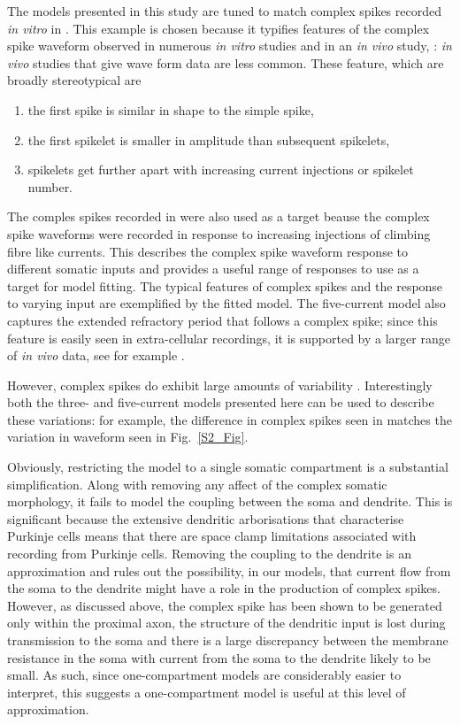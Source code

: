 \documentclass[twocolumn]{svjour3}          %
\begin{document}
The models presented in this study are tuned to match complex spikes
recorded \textsl{in vitro} in \citet{DavieEtAl2008}. This example is
chosen because it typifies features of the complex spike
waveform observed in numerous \textsl{in vitro} studies
\citep{ZaghaEtAl2008,zhang2017ethanol,MonsivaisEtAl2005,khaliq2005axonal} and in an \textsl{in vivo} study, \citet{WarnaarEtAl2015}:
\textsl{in vivo} studies that give wave form data are less common. These feature, which are broadly
stereotypical are
\begin{enumerate}
\item the first spike is similar in shape to the simple spike,
\item the first spikelet is smaller in amplitude than subsequent spikelets,
\item spikelets get further apart with increasing current injections or spikelet number.
\end{enumerate}
The comples spikes recorded in \citet{DavieEtAl2008} were also used as
a target beause the complex spike waveforms were recorded in response
to increasing injections of climbing fibre like currents. This
describes the complex spike waveform response to different somatic
inputs and provides a useful range of responses to use as a target for
model fitting. The typical features of complex spikes and the response
to varying input are exemplified by the fitted model. The five-current
model also captures the extended refractory period that follows a
complex spike; since this feature is easily seen in extra-cellular
recordings, it is supported by a larger range of \textsl{in vivo}
data, see for example
\citet{GranitPhillips1956,LathamPaul1970,BloedelRoberts1971,ArmstrongRawson1979,BausweinEtAl1983,SatoEtAl1992,BurroughsEtAl2016}.

However, complex spikes do exhibit large amounts of variability
\citep{BurroughsEtAl2016,WarnaarEtAl2015}. Interestingly both the
three- and five-current models presented here can be
used to describe these variations: for example, the difference in
complex spikes seen in \citet{MonsivaisEtAl2005} matches the variation
in waveform seen in Fig.~\ref{S2_Fig}.

Obviously, restricting the model to a single somatic compartment is a
substantial simplification. Along with removing any affect of the
complex somatic morphology, it fails to model the coupling between the
soma and dendrite. This is significant because the extensive dendritic
arborisations that characterise Purkinje cells means that there are
space clamp limitations associated with recording from Purkinje
cells. Removing the coupling to the dendrite is an approximation and
rules out the possibility, in our models, that current flow from the
soma to the dendrite might have a role in the production of complex
spikes. However, as discussed above, the complex spike has been shown
to be generated only within the proximal axon, the structure of the
dendritic input is lost during transmission to the soma and there is a
large discrepancy between the membrane resistance in the soma with
current from the soma to the dendrite likely to be small. As such,
since one-compartment models are considerably easier to interpret,
this suggests a one-compartment model is useful at this level of
approximation.
\end{document}
